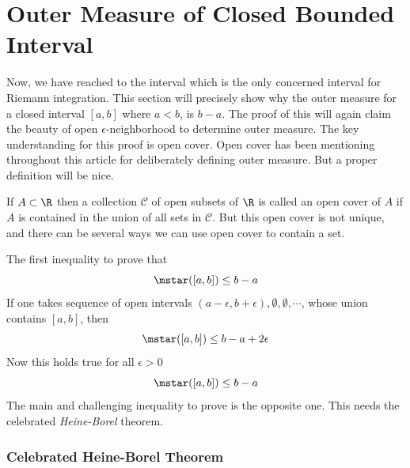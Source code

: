 \section{Outer Measure of Closed Bounded Interval}

Now, we have reached to the interval which is the only concerned interval for Riemann integration. This section will precisely show why the outer measure for a closed interval $[a, b]$ where $a<b$, is $b-a$. The proof of this will again claim the beauty of open $\epsilon$-neighborhood to determine outer measure. The key understanding for this proof is open cover. Open cover has been mentioning throughout this article for deliberately defining outer measure. But a proper definition will be nice.
\begin{definition}
    If $A \subset \R$ then a collection $\mathcal{C}$ of open subsets of $\R$ is called an open cover of $A$ if $A$ is contained in the union of all sets in $\mathcal{C}$. But this open cover is not unique, and there can be several ways we can use open cover to contain a set. 
\end{definition}
\begin{proofsketch}
    The first inequality to prove that
    \[
    \mstar([a, b]) \leq b-a
    \]
    If one takes sequence of open intervals $(a-\epsilon, b+\epsilon), \emptyset, \emptyset, \cdots$, whose union contains $[a, b]$, then
    \[
    \mstar([a, b]) \leq b-a +2\epsilon
    \]
    Now this holds true for all $\epsilon>0$
    \[
    \mstar([a, b]) \leq b-a
    \]
    The main and challenging inequality to prove is the opposite one. This needs the celebrated \textit{Heine-Borel} theorem. 
\end{proofsketch}
\subsubsection{Celebrated Heine-Borel Theorem}

